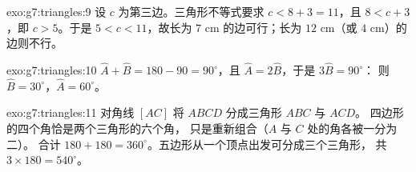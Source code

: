 \begin{solution}{exo:g7:triangles:9}
设 $c$ 为第三边。三角形不等式要求
$c < 8 + 3 = 11$，且 $8 < c + 3$，即 $c > 5$。于是
$5 < c < 11$，故长为 $7$ cm 的边可行；长为 $12$ cm（或 $4$ cm）的
边则不行。
\end{solution}

\begin{solution}{exo:g7:triangles:10}
$\widehat A + \widehat B = 180 - 90 = 90^\circ$，且
$\widehat A = 2\widehat B$，于是 $3\widehat B = 90^\circ$：
则 $\widehat B = 30^\circ$，$\widehat A = 60^\circ$。
\end{solution}

\begin{solution}{exo:g7:triangles:11}
对角线 $[AC]$ 将 $ABCD$ 分成三角形 $ABC$ 与 $ACD$。
四边形的四个角恰是两个三角形的六个角，
只是重新组合（$A$ 与 $C$ 处的角各被一分为二）。
合计 $180 + 180 = 360^\circ$。五边形从一个顶点出发可分成三个三角形，
共 $3 \times 180 = 540^\circ$。
\end{solution}

